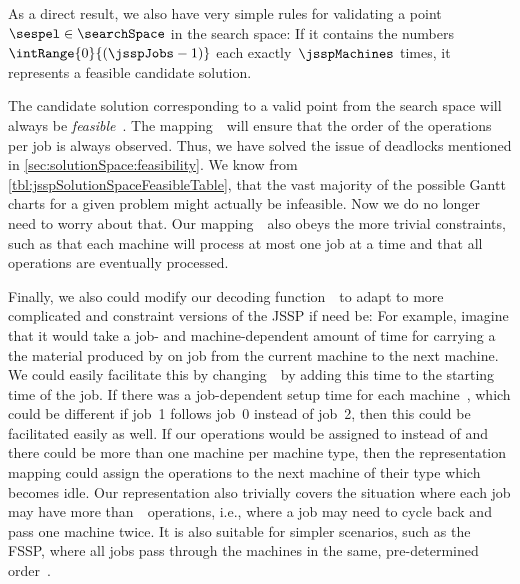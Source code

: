 As a direct result, we also have very simple rules for validating a point~$\sespel\in\searchSpace$ in the search space:
If it contains the numbers~$\intRange{0}{(\jsspJobs-1)}$ each exactly~$\jsspMachines$ times, it represents a feasible candidate solution.

The candidate solution corresponding to a valid point from the search space will always be \emph{feasible}~\cite{B1995AGPATJSSWGA}.
The mapping~\decode\ will ensure that the order of the operations per job is always observed.
Thus, we have solved the issue of deadlocks mentioned in \cref{sec:solutionSpace:feasibility}.
We know from \cref{tbl:jsspSolutionSpaceFeasibleTable}, that the vast majority of the possible Gantt charts for a given problem might actually be infeasible.
Now we do no longer need to worry about that.
Our mapping~\decode\ also obeys the more trivial constraints, such as that each machine will process at most one job at a time and that all operations are eventually processed.

Finally, we also could modify our decoding function~\decode\ to adapt to more complicated and constraint versions of the \gls{JSSP} if need be:
For example, imagine that it would take a job- and machine-dependent amount of time for carrying a the material produced by on job from the current machine to the next machine.
We could easily facilitate this by changing~\decode\ by adding this time to the starting time of the job.
If there was a job-dependent setup time for each machine~\cite{ANCK2008ASOSPWSTOC}, which could be different if job~1 follows job~0 instead of job~2, then this could be facilitated easily as well.
If our operations would be assigned to  instead of  and there could be more than one machine per machine type, then the representation mapping could assign the operations to the next machine of their type which becomes idle.
Our representation also trivially covers the situation where each job may have more than~\jsspMachines\ operations, i.e., where a job may need to cycle back and pass one machine twice.
It is also suitable for simpler scenarios, such as the \acrfull{FSSP}, where all jobs pass through the machines in the same, pre-determined order~\cite{T1993BFBSP,GJS1976TCOFAJS,W2013GAFSSPAS}.

